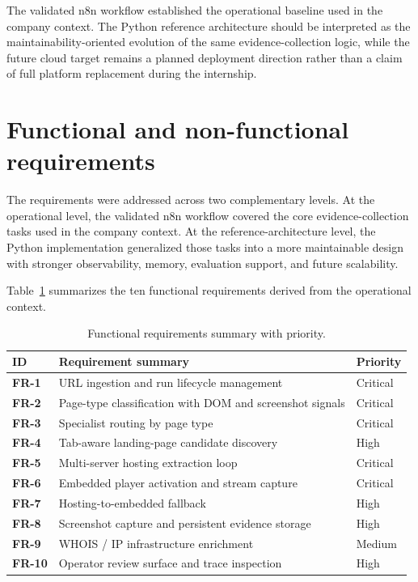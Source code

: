 The validated n8n workflow established the operational baseline used in the company context. The Python reference architecture should be interpreted as the maintainability-oriented evolution of the same evidence-collection logic, while the future cloud target remains a planned deployment direction rather than a claim of full platform replacement during the internship.

\section{Functional and non-functional requirements}

The requirements were addressed across two complementary levels. At the operational
level, the validated n8n workflow covered the core evidence-collection tasks used in the
company context. At the reference-architecture level, the Python implementation
generalized those tasks into a more maintainable design with stronger observability,
memory, evaluation support, and future scalability.

Table~\ref{tab:fr-summary} summarizes the ten functional requirements derived from the
operational context.

\begin{table}[H]
\centering
\begin{tabularx}{\textwidth}{>{\raggedright\arraybackslash\bfseries}p{1.7cm}
                              >{\raggedright\arraybackslash}X
                              >{\raggedright\arraybackslash}p{2.2cm}}
\toprule
\rowcolor{accent!8}
ID & Requirement summary & Priority \\
\midrule
FR-1 & URL ingestion and run lifecycle management & Critical \\
FR-2 & Page-type classification with DOM and screenshot signals & Critical \\
FR-3 & Specialist routing by page type & Critical \\
FR-4 & Tab-aware landing-page candidate discovery & High \\
FR-5 & Multi-server hosting extraction loop & Critical \\
FR-6 & Embedded player activation and stream capture & Critical \\
FR-7 & Hosting-to-embedded fallback & High \\
FR-8 & Screenshot capture and persistent evidence storage & High \\
FR-9 & WHOIS / IP infrastructure enrichment & Medium \\
FR-10 & Operator review surface and trace inspection & High \\
\bottomrule
\end{tabularx}
\caption{Functional requirements summary with priority.}
\label{tab:fr-summary}
\end{table}

